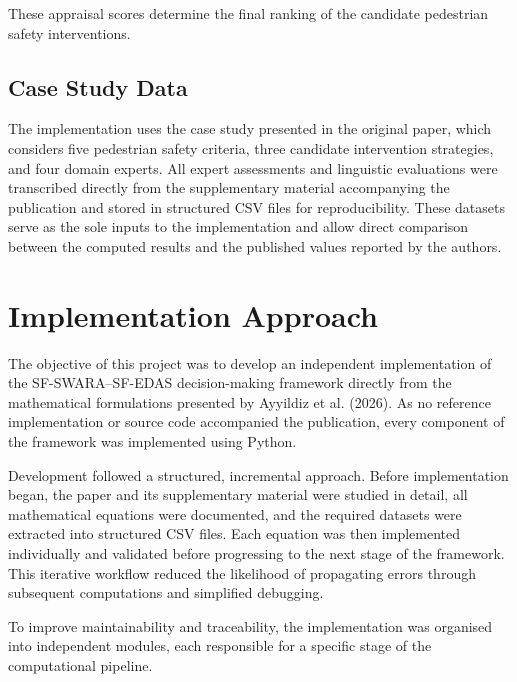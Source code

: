 \documentclass[11pt]{article}
\begin{document}
These appraisal scores determine the final ranking of the candidate pedestrian safety interventions.

\subsection{Case Study Data}
The implementation uses the case study presented in the original paper, which considers five pedestrian safety criteria, three candidate intervention strategies, and four domain experts. All expert assessments and linguistic evaluations were transcribed directly from the supplementary material accompanying the publication and stored in structured CSV files for reproducibility. These datasets serve as the sole inputs to the implementation and allow direct comparison between the computed results and the published values reported by the authors.

\section{Implementation Approach}
The objective of this project was to develop an independent implementation of the SF-SWARA--SF-EDAS decision-making framework directly from the mathematical formulations presented by Ayyildiz et al. (2026). As no reference implementation or source code accompanied the publication, every component of the framework was implemented using Python.

Development followed a structured, incremental approach. Before implementation began, the paper and its supplementary material were studied in detail, all mathematical equations were documented, and the required datasets were extracted into structured CSV files. Each equation was then implemented individually and validated before progressing to the next stage of the framework. This iterative workflow reduced the likelihood of propagating errors through subsequent computations and simplified debugging.

To improve maintainability and traceability, the implementation was organised into independent modules, each responsible for a specific stage of the computational pipeline.
\end{document}

